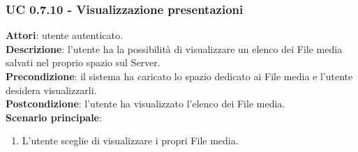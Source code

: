 	\subsubsection{UC 0.7.10 - Visualizzazione presentazioni}{
		\label{uc0.7.10}
		\textbf{Attori}: utente autenticato.	\\
		\textbf{Descrizione}: l'utente ha la possibilità di visualizzare un elenco dei File media salvati nel proprio spazio sul Server. \\
		\textbf{Precondizione}: il sistema ha caricato lo spazio dedicato ai File media e l'utente desidera visualizzarli.	\\
		\textbf{Postcondizione}: l'utente ha visualizzato l'elenco dei File media.	\\
		\textbf{Scenario principale}:
		\begin{enumerate}
			\item L'utente sceglie di visualizzare i propri File media.
		\end{enumerate}
		}